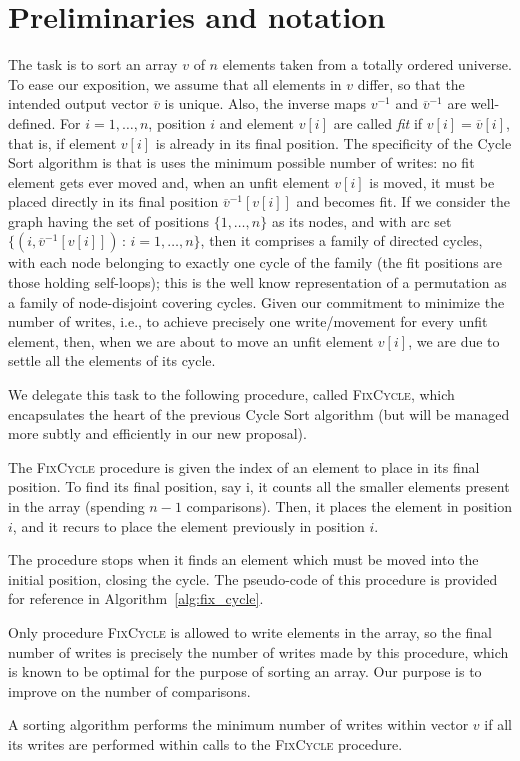 
\section{Preliminaries and notation}

The task is to sort an array $v$ of $n$ elements taken from a totally ordered universe.
To ease our exposition, we assume that all elements in $v$ differ, so that the intended output vector $\overline{v}$ is unique. 
Also, the inverse maps $v^{-1}$ and $\overline{v}^{-1}$ are well-defined.
For $i=1,\dots,n$, position $i$ and element $v[i]$ are called \emph{fit} if $v[i]=\overline{v}[i]$, that is, if element $v[i]$ is already in its final position. 
The specificity of the Cycle Sort algorithm is that is uses the minimum possible number of writes: no fit element gets ever moved and, when an unfit element $v[i]$ is moved, it must be placed directly in its final position $\overline{v}^{-1}[v[i]]$ and becomes fit. If we consider the graph having the set of positions $\{1,\ldots,n\}$ as its nodes, and with arc set $\{(i,\overline{v}^{-1}[v[i]]) \, : \, i=1,\ldots, n\}$, then it comprises a family of directed cycles, with each node belonging to exactly one cycle of the family (the fit positions are those holding self-loops); this is the well know representation of a permutation as a family of node-disjoint covering cycles. Given our commitment to minimize the number of writes, i.e., to achieve precisely one write/movement for every unfit element, then, when we are about to move an unfit element $v[i]$, we are due to settle all the elements of its cycle.

We delegate this task to the following procedure, called \textsc{FixCycle}, which encapsulates the heart of the previous Cycle Sort algorithm (but will be managed more subtly and efficiently in our new proposal).

The \textsc{FixCycle} procedure is given the index of an element to place in its final position.
To find its final position, say i, it counts all the smaller
elements present in the array (spending $n-1$ comparisons).
Then, it places the element in position $i$, and it recurs to place the
element previously in position $i$.

The procedure stops when it finds an element which must be moved into the initial position, closing the cycle.
The pseudo-code of this procedure is provided for reference in Algorithm~\ref{alg:fix_cycle}.

Only procedure \textsc{FixCycle} is allowed to write elements in the array, so the final number of writes is precisely the number of writes made by this procedure, which is known to be optimal for the purpose of sorting an array.
Our purpose is to improve on the number of comparisons.





\begin{lemma}
\label{lm_fixcycle}
A sorting algorithm performs the minimum number of writes within 
vector $v$ if all its writes are performed within calls to the \textsc{FixCycle}
procedure.
\end{lemma}